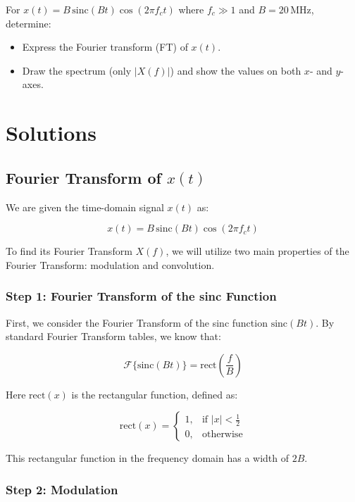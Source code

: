 \documentclass{article}
\begin{document}
For \( x(t) = B \, \text{sinc}(Bt) \cos(2\pi f_c t) \) where \( f_c \gg 1 \) and \( B = 20 \, \text{MHz} \), determine:

\begin{itemize}
  \item[(a)] Express the Fourier transform (FT) of \( x(t) \).
  \item[(b)] Draw the spectrum (only \( |X(f)| \)) and show the values on both \( x \)- and \( y \)-axes.
\end{itemize}

\section*{Solutions}

\subsection*{Fourier Transform of \( x(t) \)}

We are given the time-domain signal \( x(t) \) as:

\[
x(t) = B \, \text{sinc}(Bt) \cos(2\pi f_c t)
\]

To find its Fourier Transform \( X(f) \), we will utilize two main properties of the Fourier Transform: modulation and convolution.

\subsubsection*{Step 1: Fourier Transform of the sinc Function}

First, we consider the Fourier Transform of the sinc function \( \text{sinc}(Bt) \). By standard Fourier Transform tables, we know that:

\[
\mathcal{F}\{\text{sinc}(Bt)\} = \text{rect}\left(\frac{f}{B}\right)
\]

Here \( \text{rect}(x) \) is the rectangular function, defined as:

\[
\text{rect}(x) = 
\begin{cases} 
1, & \text{if } |x| < \frac{1}{2} \\
0, & \text{otherwise}
\end{cases}
\]

This rectangular function in the frequency domain has a width of \( 2B \).

\subsubsection*{Step 2: Modulation}
\end{document}
